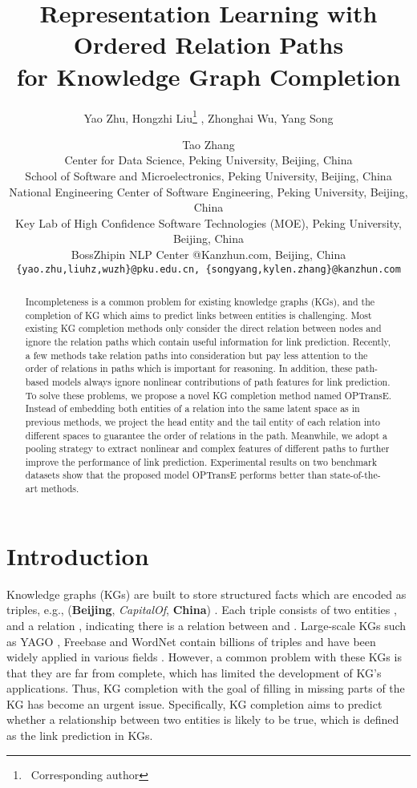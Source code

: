 \documentclass[11pt,a4paper]{article}
\title{Representation Learning with Ordered Relation Paths \\ for Knowledge Graph Completion}
\author{Yao Zhu, Hongzhi Liu\thanks{\, Corresponding author} , Zhonghai Wu, Yang Song \and Tao Zhang \\
   Center for Data Science, Peking University, Beijing, China \\
   School of Software and Microelectronics, Peking University, Beijing, China \\
   National Engineering Center of Software Engineering, Peking University, Beijing, China \\
   Key Lab of High Confidence Software Technologies (MOE), Peking University, Beijing, China \\
   BossZhipin NLP Center @Kanzhun.com, Beijing, China \\
  {\tt \{yao.zhu,liuhz,wuzh\}@pku.edu.cn, \{songyang,kylen.zhang\}@kanzhun.com} \\}
\date{}
\begin{document}
\maketitle

\begin{abstract}
Incompleteness is a common problem for existing knowledge graphs
(KGs), and the completion of KG which aims to predict links between
entities is challenging. Most existing KG completion methods only
consider the direct relation between nodes and ignore the relation
paths which contain useful information for link prediction.
Recently, a few methods take relation paths into consideration but
pay less attention to the order of relations in paths which is
important for reasoning. In addition, these path-based models always
ignore nonlinear contributions of path features for link prediction. To solve these
problems, we propose a novel KG completion method named OPTransE.
Instead of embedding both entities of a relation into the same
latent space as in previous methods, we project the head entity and
the tail entity of each relation into different spaces to guarantee
the order of relations in the path. Meanwhile, we adopt a pooling strategy to
extract nonlinear and complex features of different paths to
further improve the performance of link prediction. Experimental
results on two benchmark datasets show that the proposed model
OPTransE performs better than state-of-the-art methods.
\end{abstract}

\maketitle

\section{Introduction}

Knowledge graphs (KGs) are built to store structured facts which are
encoded as triples, e.g., (\textbf{Beijing}, \textsl{CapitalOf},
\textbf{China}) \cite{lehmann2015dbpedia}. Each triple 
consists of two entities ,  and a relation ,
indicating there is a relation  between  and .
Large-scale KGs such as YAGO \cite{suchanek2007yago}, Freebase
\cite{bollacker2008freebase} and WordNet \cite{miller1995wordnet}
contain billions of triples and have been widely applied in various
fields \cite{riedel2013relation,dong2015question}.
However, a common problem with these KGs is that they are far from
complete, which has limited the development of KG's applications.
Thus, KG completion with the goal of filling in missing parts of the KG
has become an urgent issue. Specifically, KG completion aims to
predict whether a relationship between two entities is likely to be
true, which is defined as the link prediction in KGs.
\end{document}
